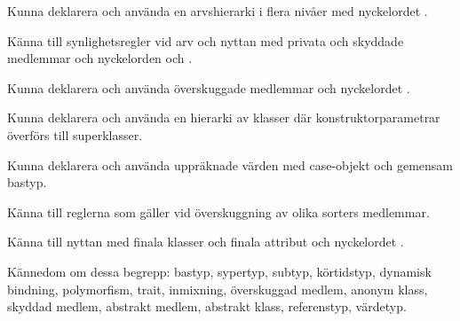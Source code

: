 

\item Kunna deklarera och använda en arvshierarki i flera nivåer med nyckelordet .

\item Känna till synlighetsregler vid arv och nyttan med privata och skyddade medlemmar och nyckelorden  och .


\item Kunna deklarera och använda överskuggade medlemmar och nyckelordet .

\item Kunna deklarera och använda en hierarki av klasser där konstruktorparametrar överförs till superklasser.

\item Kunna deklarera och använda uppräknade värden med case-objekt och gemensam bastyp.

\item Känna till reglerna som gäller vid överskuggning av olika sorters medlemmar.

\item Känna till nyttan med finala klasser och finala attribut och nyckelordet .

\item Kännedom om dessa begrepp:
bastyp,
sypertyp,
subtyp,
körtidstyp,
dynamisk bindning,
polymorfism,
trait,
inmixning,
överskuggad medlem,
anonym klass,
skyddad medlem,
abstrakt medlem,
abstrakt klass,
referenstyp,
värdetyp.







